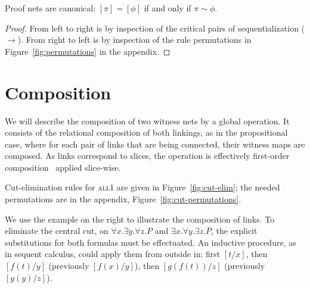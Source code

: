 \documentclass[UKenglish]{lipics-v2016}
\theoremstyle{plain}
\newcommand\all{\textsc{all}}
\newcommand\+{+}
\renewcommand\*{\times}
\newcommand\dual[1]{\overline{#1}}
\newcommand\scoal{\rightarrow} %
\begin{document}

\begin{theorem}
Proof nets are canonical: $[\pi]=[\phi]$ if and only if $\pi\sim\phi$.
\end{theorem}

\begin{proof}
From left to right is by inspection of the critical pairs of sequentialization ($\scoal$). From right to left is by inspection of the rule permutations in Figure~\ref{fig:permutations} in the appendix.
\end{proof}



\section{Composition}

\newlength\seriously
\setlength\seriously\parindent
\parbox[b]{.6\columnwidth}{
We will describe the composition of two witness nets by a global operation. It consists of the relational composition of both linkings, as in the propositional case, where for each pair of links that are being connected, their witness maps are composed. As links correspond to slices, the operation is effectively first-order composition~\cite{Mimram-2011} applied slice-wise.

\setlength\parindent\seriously
\indent
Cut-elimination rules for \all1 are given in Figure~\ref{fig:cut-elim}; the needed permutations are in the appendix, Figure~\ref{fig:cut-permutations}.
}
\quad
{}

We use the example on the right to illustrate the composition of links. To eliminate the central cut, on $\forall x.\exists y.\forall z.P$ and $\exists x.\forall y.\exists z.\dual P$, the explicit substitutions for both formulas must be effectuated. An inductive procedure, as in sequent calculus, could apply them from outside in: first $[t/x]$, then $[f(t)/y]$ (previously $[f(x)/y]$), then $[g(f(t))/z]$ (previously $[g(y)/z]$). 
\end{document}
